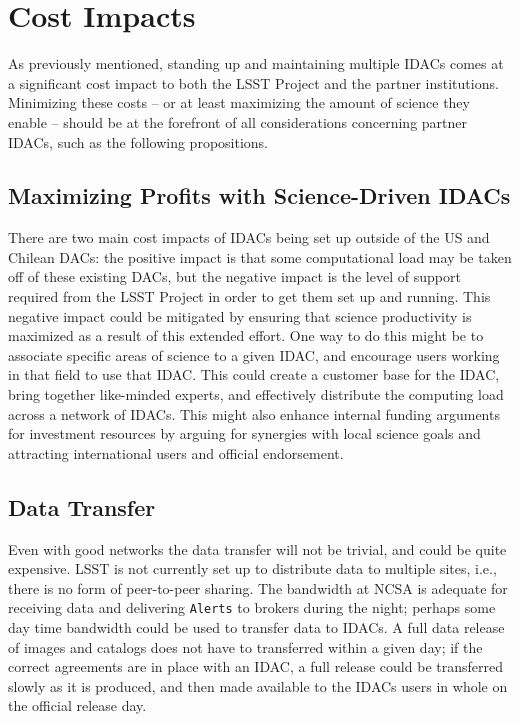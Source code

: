 \section{Cost Impacts}\label{sec:costs}

As previously mentioned, standing up and maintaining multiple IDACs comes at a significant cost impact to both the LSST Project and the partner institutions. Minimizing these costs -- or at least maximizing the amount of science they enable -- should be at the forefront of all considerations concerning partner IDACs, such as the following propositions.

\subsection{Maximizing Profits with Science-Driven IDACs}
There are two main cost impacts of IDACs being set up outside of the US and Chilean DACs: the positive impact is that some computational load may be taken off of these existing DACs, but the negative impact is the level of support required from the LSST Project in order to get them set up and running. This negative impact could be mitigated by ensuring that science productivity is maximized as a result of this extended effort. One way to do this might be to associate specific areas of science to a given IDAC, and encourage users working in that field to use that IDAC. This could create a customer base for the IDAC, bring together like-minded experts, and effectively distribute the computing load across a network of IDACs. This might also enhance internal funding arguments for investment resources by arguing for synergies with local science goals and attracting international users and official endorsement.

\subsection{Data Transfer}\label{sec:xfer}
Even with good networks the data transfer will not be trivial, and could be quite expensive. LSST is not currently set up to distribute data to multiple sites, i.e., there is no form of peer-to-peer sharing. The bandwidth at NCSA is adequate for receiving data and delivering {\tt Alerts} to brokers during the night; perhaps some day time bandwidth could be used to transfer data to IDACs. A full data release of images and catalogs does not have to transferred within a given day; if the correct agreements are in place with an IDAC, a full release could be transferred slowly as it is produced, and then made available to the IDACs users in whole on the official release day.


